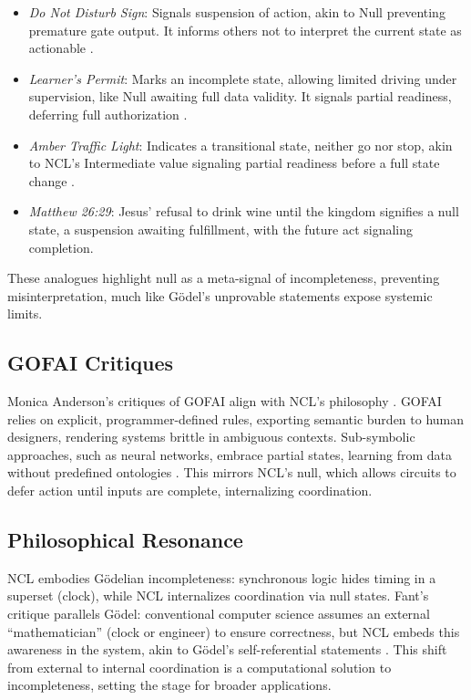 \documentclass{article}
\begin{document}
\begin{itemize}
    \item \textit{Do Not Disturb Sign}: Signals suspension of action, akin to Null preventing premature gate output. It informs others not to interpret the current state as actionable \citep{fant2005}.
    \item \textit{Learner's Permit}: Marks an incomplete state, allowing limited driving under supervision, like Null awaiting full data validity. It signals partial readiness, deferring full authorization \citep{fant2005}.
    \item \textit{Amber Traffic Light}: Indicates a transitional state, neither go nor stop, akin to NCL's Intermediate value signaling partial readiness before a full state change \citep{fant2005}.
    \item \textit{Matthew 26:29}: Jesus' refusal to drink wine until the kingdom signifies a null state, a suspension awaiting fulfillment, with the future act signaling completion.
\end{itemize}

These analogues highlight null as a meta-signal of incompleteness, preventing misinterpretation, much like G\"{o}del's unprovable statements expose systemic limits.

\subsection{GOFAI Critiques}
Monica Anderson's critiques of GOFAI align with NCL's philosophy \citep{anderson2006}. GOFAI relies on explicit, programmer-defined rules, exporting semantic burden to human designers, rendering systems brittle in ambiguous contexts. Sub-symbolic approaches, such as neural networks, embrace partial states, learning from data without predefined ontologies \citep{clark2013, hohwy2013}. This mirrors NCL's null, which allows circuits to defer action until inputs are complete, internalizing coordination.

\subsection{Philosophical Resonance}
NCL embodies G\"{o}delian incompleteness: synchronous logic hides timing in a superset (clock), while NCL internalizes coordination via null states. Fant's critique parallels G\"{o}del: conventional computer science assumes an external ``mathematician'' (clock or engineer) to ensure correctness, but NCL embeds this awareness in the system, akin to G\"{o}del's self-referential statements \citep{fant2005, nagel1958}. This shift from external to internal coordination is a computational solution to incompleteness, setting the stage for broader applications.
\end{document}
